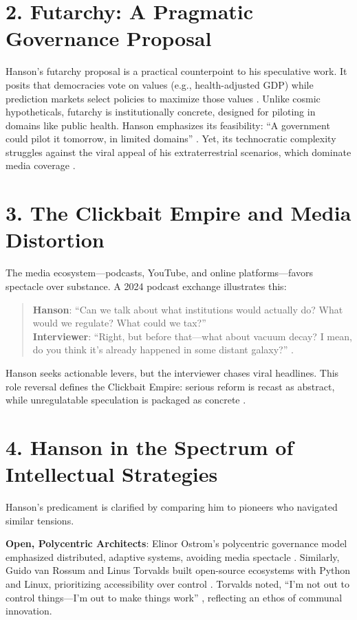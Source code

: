 \documentclass[12pt]{article}
\begin{document}
\section*{2. Futarchy: A Pragmatic Governance Proposal}

Hanson’s futarchy proposal is a practical counterpoint to his speculative work. It posits that democracies vote on values (e.g., health-adjusted GDP) while prediction markets select policies to maximize those values \citep{hanson2001,hanson2013}. Unlike cosmic hypotheticals, futarchy is institutionally concrete, designed for piloting in domains like public health. Hanson emphasizes its feasibility: ``A government could pilot it tomorrow, in limited domains'' \citep{econtalk2007}. Yet, its technocratic complexity struggles against the viral appeal of his extraterrestrial scenarios, which dominate media coverage \citep{bbc2021}.

\section*{3. The Clickbait Empire and Media Distortion}

The media ecosystem---podcasts, YouTube, and online platforms---favors spectacle over substance. A 2024 podcast exchange illustrates this:

\begin{quote}
\textbf{Hanson}: ``Can we talk about what institutions would actually do? What would we regulate? What could we tax?'' \\
\textbf{Interviewer}: ``Right, but before that---what about vacuum decay? I mean, do you think it’s already happened in some distant galaxy?'' \citep{lunar2024}.
\end{quote}

Hanson seeks actionable levers, but the interviewer chases viral headlines. This role reversal defines the Clickbait Empire: serious reform is recast as abstract, while unregulatable speculation is packaged as concrete \citep{fridman2021,bbc2021}.

\section*{4. Hanson in the Spectrum of Intellectual Strategies}

Hanson’s predicament is clarified by comparing him to pioneers who navigated similar tensions.

\textbf{Open, Polycentric Architects}: Elinor Ostrom’s polycentric governance model emphasized distributed, adaptive systems, avoiding media spectacle \citep{ostrom1990}. Similarly, Guido van Rossum and Linus Torvalds built open-source ecosystems with Python and Linux, prioritizing accessibility over control \citep{vanrossum1991,torvalds1999}. Torvalds noted, ``I’m not out to control things---I’m out to make things work'' \citep{torvalds1999}, reflecting an ethos of communal innovation.
\end{document}
